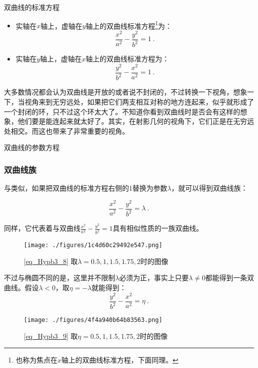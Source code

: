 \begin{theorem}{双曲线的标准方程}
\begin{itemize}
\item 实轴在$x$轴上，虚轴在$y$轴上的双曲线标准方程\footnote{也称为焦点在$x$轴上的双曲线标准方程，下面同理。}为：
\begin{equation}\label{eq_Hypb3_4}
\frac{x^2}{a^2} - \frac{y^2}{b^2} = 1~.
\end{equation}
\item 实轴在$y$轴上，虚轴在$x$轴上的双曲线标准方程为：
\begin{equation}
\frac{y^2}{b^2} -\frac{x^2}{a^2}  = 1~.
\end{equation}
\end{itemize}
\end{theorem}



大多数情况都会认为双曲线是开放的或者说不封闭的，不过转换一下视角，想象一下，当视角来到无穷远处，如果把它们两支相互对称的地方连起来，似乎就形成了一个封闭的环，只不过这个环太大了。不知道你看到双曲线时是否会有这样的想象，他们要是能连起来就太好了。其实，在射影几何的视角下，它们正是在无穷远处相交。而这也带来了非常重要的视角。

\begin{theorem}{双曲线的参数方程}

\end{theorem}
\subsubsection{双曲线族}

与类似，如果把双曲线的标准方程右侧的1替换为参数$\lambda$，就可以得到双曲线族：

\begin{equation}\label{eq_Hypb3_8}
\frac{x^2}{a^2} - \frac{y^2}{b^2} = \lambda~.
\end{equation}

同样，它代表着与双曲线$\displaystyle\frac{x^2}{a^2} - \frac{y^2}{b^2} = 1$具有相似性质的一族双曲线。

\begin{figure}[ht]
\centering
\texttt{[image: ./figures/1c4d60c29492e547.png]}
\caption{\autoref{eq_Hypb3_8} 取$\lambda=0.5,1,1.5,1.75,2$时的图像} \label{fig_Hypb3_5}
\end{figure}


不过与椭圆不同的是，这里并不限制$\lambda$必须为正，事实上只要$\lambda\neq0$都能得到一条双曲线。假设$\lambda<0$，取$\eta=-\lambda$就能得到：
\begin{equation}\label{eq_Hypb3_9}
\frac{y^2}{b^2}-\frac{x^2}{a^2} = \eta~.
\end{equation}
\begin{figure}[ht]
\centering
\texttt{[image: ./figures/4f4a940b64b83563.png]}
\caption{\autoref{eq_Hypb3_9} 取$\eta=0.5,1,1.5,1.75,2$时的图像} \label{fig_Hypb3_6}
\end{figure}

